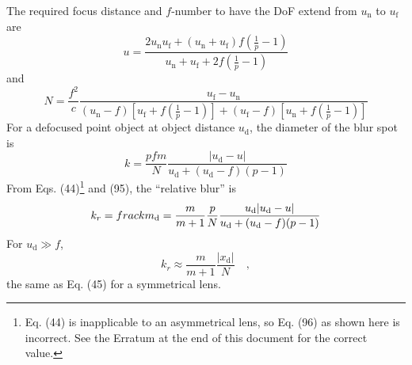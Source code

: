 \documentclass[11pt, oneside]{scrartcl}   	%
\begin{document}
The required focus distance and $f$-number to have the DoF extend from
$u_\mathrm{n}$ to $u_\mathrm{f}$ are
\begin{equation}
  \label{eq:93}
  u = \frac{2u_\mathrm{n}u_\mathrm{f} +
    (u_\mathrm{n}+u_\mathrm{f})f\left(\frac1p-1\right)}{u_\mathrm{n}+u_\mathrm{f}+2f\left(\frac1p-1\right)}
\end{equation}
and
\begin{equation}
  \label{eq:94}
  N=\frac{f^2}c\frac{u_\mathrm{f}-u_\mathrm{n}}{(u_\mathrm{n}-f)\left[u_\mathrm{f}+f\left(\frac1p-1\right)\right]+(u_\mathrm{f}-f)\left[u_\mathrm{n}+f\left(\frac1p-1\right)\right]}
\end{equation}
For a defocused point object at object distance $u_\mathrm{d}$, the diameter of
the blur spot is
\begin{equation}
  \label{eq:95}
  k  = \frac{pfm}N\frac{|u_\mathrm{d}-u|}{u_\mathrm{d}+(u_\mathrm{d}-f)(p-1)}
\end{equation}
From Eqs. (44)\footnote{Eq. (44) is inapplicable to an asymmetrical lens, so Eq. (96) as
shown here is incorrect. See the Erratum at the end
of this document for the correct value.} and (95), the “relative blur”
is
\begin{equation}
  \label{eq:96}
  k_r=\\frac k {m_\mathrm{d}} = \frac m{m+1} \frac p N
  \frac{u_\mathrm{d}|u_\mathrm{d}-u|}{u_\mathrm{d}+(u_\mathrm{d}-f)(p-1)}
\end{equation}
For $u_\mathrm{d} \gg f$,
\begin{equation}
  \label{eq:97}
  k_r\approx \frac m{m+1} \frac{|x_\mathrm{d}|}N\quad,
\end{equation}
the same as Eq. (45) for a symmetrical lens.
\end{document}
